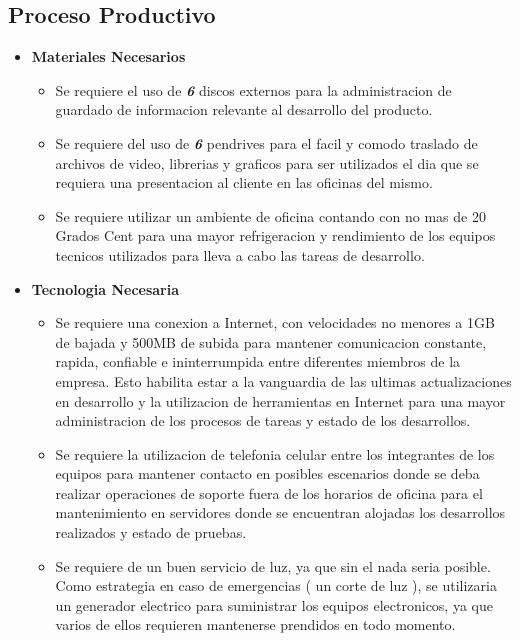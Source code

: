 \documentclass[
10pt, %
a4paper, %
oneside, %
headinclude,footinclude, %
BCOR5mm, %
]{scrartcl}
\begin{document}
\subsection{Proceso Productivo}
\begin{itemize}
  \item \textbf {Materiales Necesarios}
  \begin{itemize}
    \item Se requiere el uso de \emph { \textbf{6} } discos externos para la
            administracion de guardado de informacion relevante al desarrollo
            del producto.
    \item Se requiere del uso de \emph { \textbf{6} } pendrives para el facil
            y comodo traslado de archivos de video, librerias y graficos
            para ser utilizados el dia que se requiera una presentacion al
            cliente en las oficinas del mismo.
    \item Se requiere utilizar un ambiente de oficina  contando con no mas
            de 20 Grados Cent para una mayor refrigeracion y rendimiento de los
            equipos tecnicos utilizados para lleva a cabo las tareas de desarrollo.
  \end{itemize}

  \item \textbf {Tecnologia Necesaria}
  \begin{itemize}
    \item Se requiere una conexion a Internet, con velocidades no menores a
            1GB de bajada y 500MB de subida para mantener comunicacion
            constante, rapida, confiable e ininterrumpida entre diferentes
            miembros de la empresa. Esto habilita estar a la vanguardia de las
            ultimas actualizaciones en desarrollo y la utilizacion de
            herramientas en Internet para una mayor administracion de los
            procesos de tareas y estado de los desarrollos.
    \item Se requiere la utilizacion de telefonia celular entre los integrantes
            de los equipos para mantener contacto en posibles escenarios donde
            se deba realizar operaciones de soporte fuera de los horarios de
            oficina para el mantenimiento en servidores donde se encuentran
            alojadas los desarrollos realizados y estado de pruebas.

    \item Se requiere de un buen servicio de luz, ya que sin el nada seria
            posible. Como estrategia en caso de emergencias ( un corte de luz ),
            se utilizaria un generador electrico para suministrar los
            equipos electronicos, ya que varios de ellos requieren mantenerse
            prendidos en todo momento.
  \end{itemize}


\end{itemize}
\end{document}
